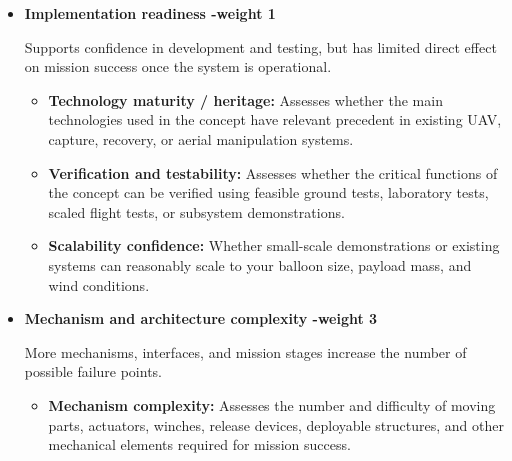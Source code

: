         

\begin{itemize}
    \item \textbf{Implementation readiness -weight 1}
    
    Supports confidence in development and testing, but has limited direct effect on mission success once the system is operational.
    
    \begin{itemize}
        \item \textbf{Technology maturity / heritage:} Assesses whether the main technologies used in the concept have relevant precedent in existing UAV, capture, recovery, or aerial manipulation systems.
        
        \item \textbf{Verification and testability:} Assesses whether the critical functions of the concept can be verified using feasible ground tests, laboratory tests, scaled flight tests, or subsystem demonstrations.

        \item \textbf{Scalability confidence:}
        Whether small-scale demonstrations or existing systems can reasonably scale to your balloon size, payload mass, and wind conditions.
    \end{itemize}

    \item \textbf{Mechanism and architecture complexity -weight 3}

    More mechanisms, interfaces, and mission stages increase the number of possible failure points.
    
    \begin{itemize}
        \item \textbf{Mechanism complexity:} Assesses the number and difficulty of moving parts, actuators, winches, release devices, deployable structures, and other mechanical elements required for mission success.
        

\end{itemize}
\end{itemize}
